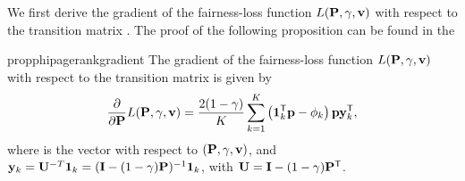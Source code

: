 \documentclass[sigconf, anonymous, review]{acmart}
\begin{document}
We first derive the gradient of the fairness-loss function 
$L(\mathbf{{P}}, \gamma, \mathbf{{v}})$ 
with respect to the transition matrix \transmatrix.
The proof of the following proposition can be found in the







\begin{restatable}{prop}{phipagerankgradient}
\label{theorem:gradient-fairness-loss}
The gradient of the fairness-loss function 
$L(\mathbf{{P}}, \gamma, \mathbf{{v}})$ 
with respect to the transition matrix \transmatrix is given by
\begin{equation}
\label{equation:gradient}
    \frac{\partial}{\partial \mathbf{{P}}} L(\mathbf{{P}}, \gamma, \mathbf{{v}}) 
         =  \frac{2(1 - \gamma)}{K} \sum_{k=1}^{K} 
            \left(\mathbf{{1}}_{k}^{\mathsf{T}} \mathbf{{p}} - \phi_k\right) \mathbf{{p}} \mathbf{{y}}_k^{\mathsf{T}},   
\end{equation}
where  \prvector is the \pagerank vector with respect to $(\mathbf{{P}}, \gamma, \mathbf{{v}})$, 
and 
$\mathbf{{y}}_k = \mathbf{{U}}^{-T} \mathbf{{1}}_{k} = 
    (\mathbf{{I}} - (1 - \gamma) \mathbf{{P}})^{-1} \mathbf{{1}}_{k}$, 
with $\mathbf{{U}} = \mathbf{{I}} - (1 - \gamma) \mathbf{{P}}^{\mathsf{T}}$.
\end{restatable}


\end{document}
